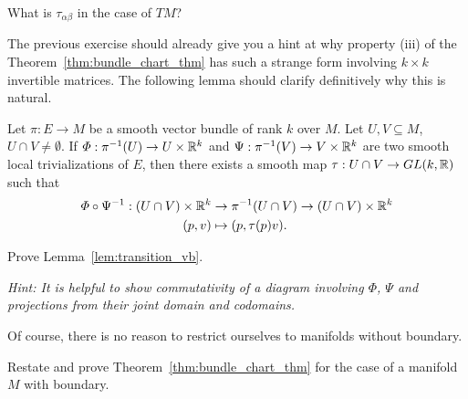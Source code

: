 \begin{exercise}
	What is $\tau_{\alpha\beta}$ in the case of $TM$?
\end{exercise}

The previous exercise should already give you a hint at why property (iii) of the Theorem~\ref{thm:bundle_chart_thm} has such a strange form involving $k\times k$ invertible matrices.
The following lemma should clarify definitively why this is natural.

\begin{lemma}\label{lem:transition_vb}
	Let $\pi:E \to M$ be a smooth vector bundle of rank $k$ over $M$. Let $U,V\subseteq M$, $U\cap V\neq \emptyset$.
	If $\varPhi : \pi^{-1}(U) \to U \times \mathbb{R}^k$ and $\Psi: \pi^{-1}(V) \to V \times \mathbb{R}^k$ are two smooth local trivializations of $E$, then there exists a smooth map $\tau: U\cap V \to GL(k, \mathbb{R})$ such that
	\begin{align}
		\varPhi\circ\Psi^{-1} : (U\cap V)\times\mathbb{R}^k & \to \pi^{-1}(U\cap V) \to (U\cap V)\times \mathbb{R}^k \\
		(p,v)                                       & \mapsto (p, \tau(p) v).
	\end{align}
\end{lemma}
\begin{exercise}
	Prove Lemma~\ref{lem:transition_vb}.

	\textit{\small Hint: It is helpful to show commutativity of a diagram involving $\varPhi$, $\Psi$ and projections from their joint domain and codomains.}
\end{exercise}

Of course, there is no reason to restrict ourselves to manifolds without boundary.
\begin{exercise}
	Restate and prove Theorem~\ref{thm:bundle_chart_thm} for the case of a manifold $M$ with boundary.
\end{exercise}

